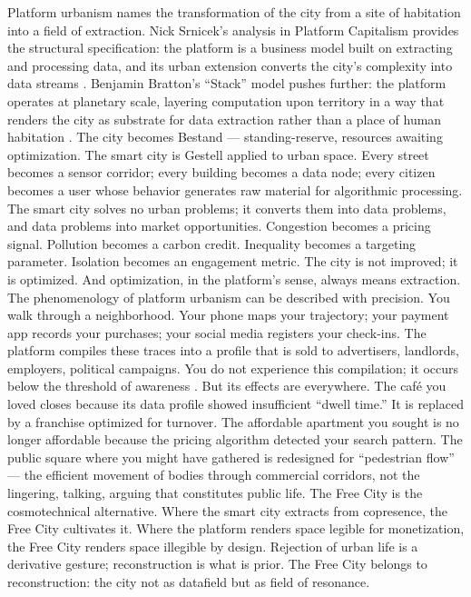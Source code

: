 Platform urbanism names the transformation of the city from a site of habitation into a field of extraction. Nick Srnicek’s analysis in Platform Capitalism provides the structural specification: the platform is a business model built on extracting and processing data, and its urban extension converts the city’s complexity into data streams \cite[pp.~42--79]{srnicek_2017}. Benjamin Bratton’s “Stack” model pushes further: the platform operates at planetary scale, layering computation upon territory in a way that renders the city as substrate for data extraction rather than a place of human habitation \cite[pp.~41--88]{bratton_2015}. The city becomes Bestand — standing-reserve, resources awaiting optimization. The smart city is Gestell applied to urban space. Every street becomes a sensor corridor; every building becomes a data node; every citizen becomes a user whose behavior generates raw material for algorithmic processing. The smart city solves no urban problems; it converts them into data problems, and data problems into market opportunities. Congestion becomes a pricing signal. Pollution becomes a carbon credit. Inequality becomes a targeting parameter. Isolation becomes an engagement metric. The city is not improved; it is optimized. And optimization, in the platform’s sense, always means extraction. The phenomenology of platform urbanism can be described with precision. You walk through a neighborhood. Your phone maps your trajectory; your payment app records your purchases; your social media registers your check-ins. The platform compiles these traces into a profile that is sold to advertisers, landlords, employers, political campaigns. You do not experience this compilation; it occurs below the threshold of awareness \cite[pp.~29--58]{hayles_2017}. But its effects are everywhere. The café you loved closes because its data profile showed insufficient “dwell time.” It is replaced by a franchise optimized for turnover. The affordable apartment you sought is no longer affordable because the pricing algorithm detected your search pattern. The public square where you might have gathered is redesigned for “pedestrian flow” — the efficient movement of bodies through commercial corridors, not the lingering, talking, arguing that constitutes public life. The Free City is the cosmotechnical alternative. Where the smart city extracts from copresence, the Free City cultivates it. Where the platform renders space legible for monetization, the Free City renders space illegible by design. Rejection of urban life is a derivative gesture; reconstruction is what is prior. The Free City belongs to reconstruction: the city not as datafield but as field of resonance.

